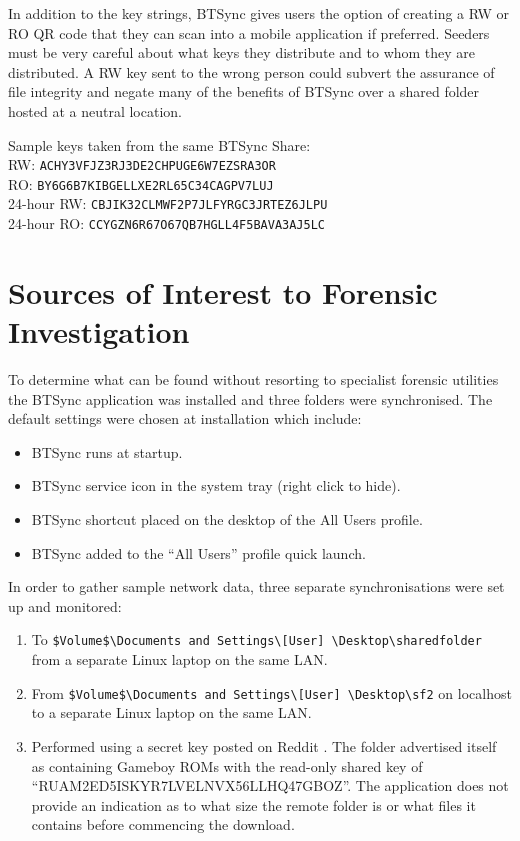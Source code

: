 \documentclass[final,5p,times,twocolumn]{elsarticle}
\begin{document}
In addition to the key strings, BTSync gives users the option of creating a RW or RO QR code that they can scan into a mobile application if preferred. Seeders must be very careful about what keys they distribute and to whom they are distributed. A RW key sent to the wrong person could subvert the assurance of file integrity and negate many of the benefits of BTSync over a shared folder hosted at a neutral location. 

Sample keys taken from the same BTSync Share:\\
RW: \texttt{ACHY3VFJZ3RJ3DE2CHPUGE6W7EZSRA3OR}\\
RO: \texttt{BY6G6B7KIBGELLXE2RL65C34CAGPV7LUJ}\\
24-hour RW: \texttt{CBJIK32CLMWF2P7JLFYRGC3JRTEZ6JLPU}\\
24-hour RO: \texttt{CCYGZN6R67O67QB7HGLL4F5BAVA3AJ5LC}

\section{Sources of Interest to Forensic Investigation}
\label{sources}
To determine what can be found without resorting to specialist forensic utilities the BTSync application was installed and three folders were synchronised. The default settings were chosen at installation which include:
\begin{itemize}
\item BTSync runs at startup.
\item BTSync service icon in the system tray (right click to hide).
\item BTSync shortcut placed on the desktop of the All Users profile.
\item BTSync added to the ``All Users'' profile quick launch.
\end{itemize}

In order to gather sample network data, three separate synchronisations were set up and monitored:
\begin{enumerate}
\item To \texttt{\$Volume\$\textbackslash Documents and Settings\textbackslash [User] \textbackslash Desktop\textbackslash sharedfolder} from a separate Linux laptop on the same LAN.
\item From \texttt{\$Volume\$\textbackslash Documents and Settings\textbackslash [User] \textbackslash Desktop\textbackslash sf2} on localhost to a separate Linux laptop on the same LAN.
\item Performed using a secret key posted on Reddit \cite{reddit}. The folder advertised itself as containing Gameboy ROMs with the read-only shared key of ``RUAM2ED5ISKYR7LVELNVX56LLHQ47GBOZ''. The application does not provide an indication as to what size the remote folder is or what files it contains before commencing the download.
\end{enumerate}
\end{document}
